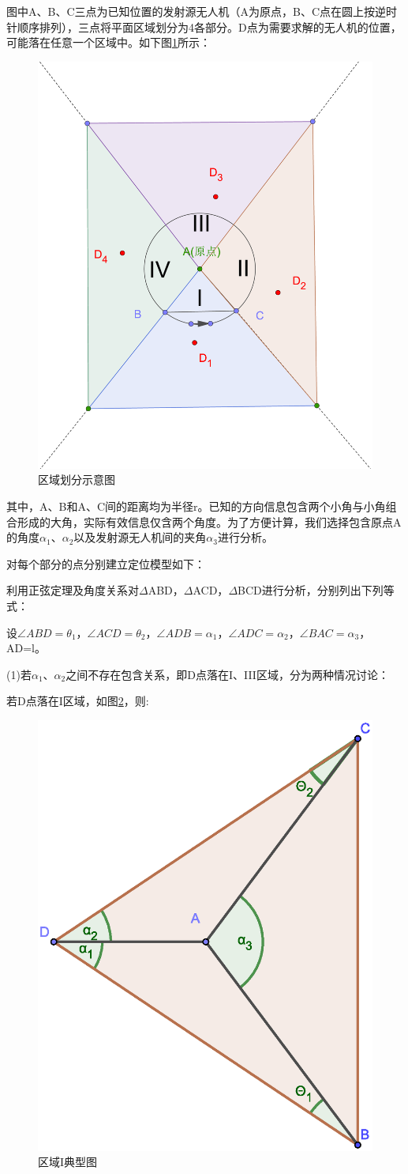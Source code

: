 \documentclass{ctexart}
\begin{document}
图中A、B、C三点为已知位置的发射源无人机（A为原点，B、C点在圆上按逆时针顺序排列），三点将平面区域划分为4各部分。D点为需要求解的无人机的位置，可能落在任意一个区域中。如下图\ref{区域划分示意图}所示：

\begin{figure}[H]
  \centering
  \includegraphics[width=0.40\linewidth]{pic/quadrant(1).eps}
  \caption{区域划分示意图}
  \label{区域划分示意图}
  \end{figure} 


其中，A、B和A、C间的距离均为半径r。已知的方向信息包含两个小角与小角组合形成的大角，实际有效信息仅含两个角度。为了方便计算，我们选择包含原点A的角度$\alpha_1$、$\alpha_2$以及发射源无人机间的夹角$\alpha_3$进行分析。

对每个部分的点分别建立定位模型如下：

利用正弦定理及角度关系对$\Delta$ABD，$\Delta$ACD，$\Delta$BCD进行分析，分别列出下列等式：

设$\angle ABD=\theta_1$，$\angle ACD=\theta_2$，$\angle ADB=\alpha_1$，$\angle ADC=\alpha_2$，$\angle BAC=\alpha_3$，AD=l。

(1)若$\alpha_1$、$\alpha_2$之间不存在包含关系，即D点落在I、III区域，分为两种情况讨论：

若D点落在I区域，如图\ref{区域I典型图}，则:

\begin{figure}[H]
  \centering
  \includegraphics[width=0.35\linewidth]{pic/case1++.eps}
  \caption{区域I典型图}
  \label{区域I典型图}
  \end{figure} 
\end{document}
